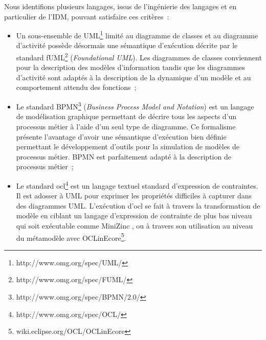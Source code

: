 Nous identifions plusieurs langages, issus de l'ingénierie des langages et en particulier de l'IDM, pouvant satisfaire ces critères~:

\begin{itemize}

\item Un sous-ensemble de UML\footnote{http://www.omg.org/spec/UML/} limité au diagramme de classes et au diagramme d'activité possède désormais une sémantique d'exécution décrite par le standard fUML\footnote{http://www.omg.org/spec/FUML/} (\textit{Foundational UML}). Les diagrammes de classes conviennent pour la description des modèles d'information tandis que les diagrammes d'activité sont adaptés à la description de la dynamique d'un modèle et au comportement attendu des fonctions~;

\item Le standard BPMN\footnote{http://www.omg.org/spec/BPMN/2.0/} (\textit{Business Process Model and Notation}) est un langage de modélisation graphique permettant de décrire tous les aspects d'un processus métier à l'aide d'un seul type de diagramme. Ce formalisme présente l'avantage d'avoir une sémantique d'exécution bien définie permettant le développement d'outils pour la simulation de modèles de processus métier. BPMN est parfaitement adapté à la description de processus métier~;

\item Le standard \gls{ocl}\footnote{http://www.omg.org/spec/OCL/} est un langage textuel standard d'expression de contraintes. Il est adosser à UML pour exprimer les propriétés difficiles à capturer dans des diagrammes UML. L'exécution d'\gls{ocl} se fait à travers la transformation de modèle en ciblant un langage d'expression de contrainte de plus bas niveau qui soit exécutable comme MiniZinc \cite{nethercote2007minizinc}, ou à travers son utilisation au niveau du métamodèle avec OCLinEcore\footnote{wiki.eclipse.org/OCL/OCLinEcore}.

\end{itemize}










